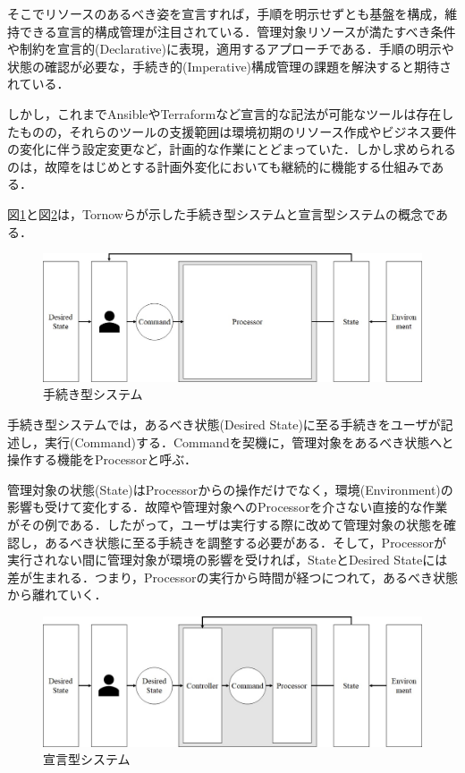\documentclass[12pt,a4j]{ujreport}
\begin{document}
そこでリソースのあるべき姿を宣言すれば，手順を明示せずとも基盤を構成，維持できる宣言的構成管理が注目されている．管理対象リソースが満たすべき条件や制約を宣言的(Declarative)に表現，適用するアプローチである\cite{ref1}．手順の明示や状態の確認が必要な，手続き的(Imperative)構成管理の課題を解決すると期待されている．

しかし，これまでAnsible\cite{ref2}やTerraform\cite{ref3}など宣言的な記法が可能なツールは存在したものの，それらのツールの支援範囲は環境初期のリソース作成やビジネス要件の変化に伴う設定変更など，計画的な作業にとどまっていた．しかし求められるのは，故障をはじめとする計画外変化においても継続的に機能する仕組みである．

図\ref{fig1}と図\ref{fig2}は，Tornowらが示した手続き型システムと宣言型システムの概念\cite{ref4}である．

\newpage
\begin{figure}[tb]
    \centerline{\includegraphics[clip,width=140mm]{images/imperative-system.jpg}}
    \caption{手続き型システム}\label{fig1}
\end{figure}

手続き型システムでは，あるべき状態(Desired State)に至る手続きをユーザが記述し，実行(Command)する．Commandを契機に，管理対象をあるべき状態へと操作する機能をProcessorと呼ぶ．

管理対象の状態(State)はProcessorからの操作だけでなく，環境(Environment)の影響も受けて変化する．故障や管理対象へのProcessorを介さない直接的な作業がその例である．したがって，ユーザは実行する際に改めて管理対象の状態を確認し，あるべき状態に至る手続きを調整する必要がある．そして，Processorが実行されない間に管理対象が環境の影響を受ければ，StateとDesired Stateには差が生まれる．つまり，Processorの実行から時間が経つにつれて，あるべき状態から離れていく．

\begin{figure}[h]
    \centerline{\includegraphics[clip,width=140mm]{images/declarative-system.jpg}}
    \caption{宣言型システム}\label{fig2}
\end{figure}
\end{document}
